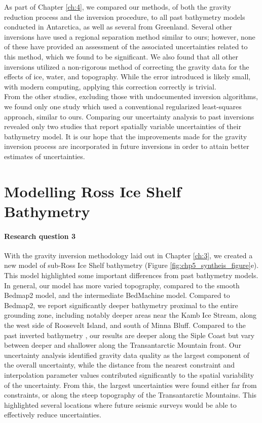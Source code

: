 As part of Chapter \ref{ch:4}, we compared our methods, of both the gravity reduction process and the inversion procedure, to all past bathymetry models conducted in Antarctica, as well as several from Greenland. Several other inversions have used a regional separation method similar to ours; however, none of these have provided an assessment of the associated uncertainties related to this method, which we found to be significant. We also found that all other inversions utilized a non-rigorous method of correcting the gravity data for the effects of ice, water, and topography. While the error introduced is likely small, with modern computing, applying this correction correctly is trivial. \\

From the other studies, excluding those with undocumented inversion algorithms, we found only one study which used a conventional regularized least-squares approach, similar to ours. Comparing our uncertainty analysis to past inversions revealed only two studies that report spatially variable uncertainties of their bathymetry model. It is our hope that the improvements made for the gravity inversion process are incorporated in future inversions in order to attain better estimates of uncertainties. \\

\section[Ross Ice Shelf bathymetry]{Modelling Ross Ice Shelf Bathymetry}
\paragraph*{Research question 3}

With the gravity inversion methodology laid out in Chapter \ref{ch:3}, we created a new model of sub-Ross Ice Shelf bathymetry (Figure \ref{fig:chp5_syntheis_figure}e). This model highlighted some important differences from past bathymetry models. In general, our model has more varied topography, compared to the smooth Bedmap2 model, and the intermediate BedMachine model. Compared to Bedmap2, we report significantly deeper bathymetry proximal to the entire grounding zone, including notably deeper areas near the Kamb Ice Stream, along the west side of Roosevelt Island, and south of Minna Bluff. Compared to the past inverted bathymetry \citep{tintoross2019}, our results are deeper along the Siple Coast but vary between deeper and shallower along the Transantarctic Mountain front. Our uncertainty analysis identified gravity data quality as the largest component of the overall uncertainty, while the distance from the nearest constraint and interpolation parameter values contributed significantly to the spatial variability of the uncertainty. From this, the largest uncertainties were found either far from constraints, or along the steep topography of the Transantarctic Mountains. This highlighted several locations where future seismic surveys would be able to effectively reduce uncertainties.


